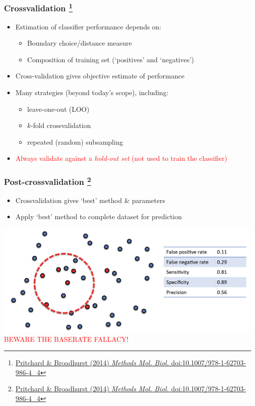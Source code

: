 \begin{frame}
  \frametitle{Crossvalidation
    \footnote{\tiny{\href{http://dx.doi.org/10.1007/978-1-62703-986-4_4}{Pritchard \& Broadhurst (2014) \textit{Methods Mol. Biol.} doi:10.1007/978-1-62703-986-4\_4}}}
}
      \begin{itemize}  
        \item \textcolor{hutton_green}{Estimation of classifier performance depends on:}
          \begin{itemize}
            \item Boundary choice/distance measure
            \item Composition of training set (`positives' and `negatives')
          \end{itemize}
        \item \textcolor{hutton_blue}{Cross-validation gives objective estimate of performance}
        \item \textcolor{hutton_purple}{Many strategies (beyond today's scope), including:}
          \begin{itemize}
            \item leave-one-out (LOO)
            \item $k$-fold crossvalidation
            \item repeated (random) subsampling
          \end{itemize}
        \item \textcolor{red}{Always validate against a \textit{hold-out set} (not used to train the classifier)}
        \end{itemize}          
\end{frame}

\begin{frame}
  \frametitle{Post-crossvalidation
  \footnote{\tiny{\href{http://dx.doi.org/10.1007/978-1-62703-986-4_4}{Pritchard \& Broadhurst (2014) \textit{Methods Mol. Biol.} doi:10.1007/978-1-62703-986-4\_4}}}
}
  \begin{itemize}
    \item \textcolor{hutton_green}{Crossvalidation gives `best' method \& parameters}
    \item \textcolor{hutton_purple}{Apply `best' method to complete dataset for prediction}
  \end{itemize}
  \includegraphics[width=1\textwidth]{images/finding_effectors12}    \\
  \textcolor{red}{BEWARE THE BASERATE FALLACY!}
\end{frame}

